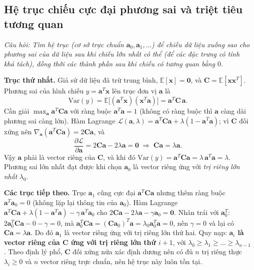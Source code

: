 \subsection{Hệ trục chiếu cực đại phương sai và triệt tiêu tương quan}
\label{subsec:w8_max_variance}

\textit{Câu hỏi: Tìm hệ trục (cơ sở trực chuẩn $\mathbf{a}_0, \mathbf{a}_1, \ldots$) để chiếu dữ liệu xuống sao cho phương sai của dữ liệu sau khi chiếu lớn nhất có thể (để các đặc trưng có tính khả tách), đồng thời các thành phần sau khi chiếu có tương quan bằng $0$.}

\textbf{Trục thứ nhất.} Giả sử dữ liệu đã trừ trung bình, $\mathbb{E}[\mathbf{x}] = \mathbf{0}$, và $\mathbf{C} = \mathbb{E}[\mathbf{x}\mathbf{x}^T]$. Phương sai của hình chiếu $y = \mathbf{a}^T\mathbf{x}$ lên trục đơn vị $\mathbf{a}$ là
\begin{equation}
\mathrm{Var}(y) = \mathbb{E}\big[(\mathbf{a}^T\mathbf{x})(\mathbf{x}^T\mathbf{a})\big] = \mathbf{a}^T\mathbf{C}\,\mathbf{a}.
\end{equation}
Cần giải $\max_{\mathbf{a}} \mathbf{a}^T\mathbf{C}\mathbf{a}$ với ràng buộc $\mathbf{a}^T\mathbf{a} = 1$ (không có ràng buộc thì $\mathbf{a}$ càng dài phương sai càng lớn). Hàm Lagrange $\mathcal{L}(\mathbf{a}, \lambda) = \mathbf{a}^T\mathbf{C}\mathbf{a} + \lambda(1 - \mathbf{a}^T\mathbf{a})$; vì $\mathbf{C}$ đối xứng nên $\nabla_{\mathbf{a}}(\mathbf{a}^T\mathbf{C}\mathbf{a}) = 2\mathbf{C}\mathbf{a}$, và
\begin{equation}
\frac{\partial\mathcal{L}}{\partial\mathbf{a}} = 2\mathbf{C}\mathbf{a} - 2\lambda\mathbf{a} = \mathbf{0} \;\Longrightarrow\; \mathbf{C}\mathbf{a} = \lambda\mathbf{a}.
\end{equation}
Vậy $\mathbf{a}$ phải là vector riêng của $\mathbf{C}$, và khi đó $\mathrm{Var}(y) = \mathbf{a}^T\mathbf{C}\mathbf{a} = \lambda\,\mathbf{a}^T\mathbf{a} = \lambda$. Phương sai lớn nhất đạt được khi chọn $\mathbf{a}_0$ là vector riêng ứng với \emph{trị riêng lớn nhất} $\lambda_0$.

\textbf{Các trục tiếp theo.} Trục $\mathbf{a}_1$ cũng cực đại $\mathbf{a}^T\mathbf{C}\mathbf{a}$ nhưng thêm ràng buộc $\mathbf{a}^T\mathbf{a}_0 = 0$ (không lặp lại thông tin của $\mathbf{a}_0$). Hàm Lagrange $\mathbf{a}^T\mathbf{C}\mathbf{a} + \lambda(1 - \mathbf{a}^T\mathbf{a}) - \gamma\,\mathbf{a}^T\mathbf{a}_0$ cho $2\mathbf{C}\mathbf{a} - 2\lambda\mathbf{a} - \gamma\mathbf{a}_0 = \mathbf{0}$. Nhân trái với $\mathbf{a}_0^T$: $2\mathbf{a}_0^T\mathbf{C}\mathbf{a} - 0 - \gamma = 0$, mà $\mathbf{a}_0^T\mathbf{C}\mathbf{a} = (\mathbf{C}\mathbf{a}_0)^T\mathbf{a} = \lambda_0\mathbf{a}_0^T\mathbf{a} = 0$, nên $\gamma = 0$ và lại có $\mathbf{C}\mathbf{a} = \lambda\mathbf{a}$. Do đó $\mathbf{a}_1$ là vector riêng ứng với trị riêng lớn thứ hai. Quy nạp: \textbf{$\mathbf{a}_i$ là vector riêng của $\mathbf{C}$ ứng với trị riêng lớn thứ $i + 1$}, với $\lambda_0 \ge \lambda_1 \ge \ldots \ge \lambda_{n-1}$. Theo định lý phổ, $\mathbf{C}$ đối xứng nửa xác định dương nên có đủ $n$ trị riêng thực $\lambda_i \ge 0$ và $n$ vector riêng trực chuẩn, nên hệ trục này luôn tồn tại.

